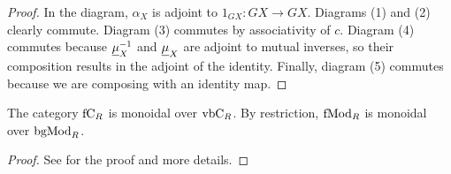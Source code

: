 \documentclass[Thesis.tex]{subfiles}
\begin{document}
\begin{proof}
%

In the diagram, $\alpha_X$ is adjoint to $1_{GX}:GX\to GX$. Diagrams (1) and (2) clearly commute. Diagram (3) commutes by associativity of $c$. Diagram (4) commutes because $\underline{\mu}^{-1}_X$ and $\underline{\mu}_X$ are adjoint to mutual inverses, so their composition results in the adjoint of the identity. Finally, diagram (5) commutes because we are composing with an identity map. 
\end{proof}

\begin{lem}\label{4.15}
The category $\mathrm{fC}_R$ is monoidal over $\mathrm{vbC}_R$. By restriction, $\mathrm{fMod}_R$ is monoidal over $\mathrm{bgMod}_R$.
\end{lem}
\begin{proof}
See \cite[Lemma 4.15]{whitehouse} for the proof and more details.
\end{proof}
\end{document}
